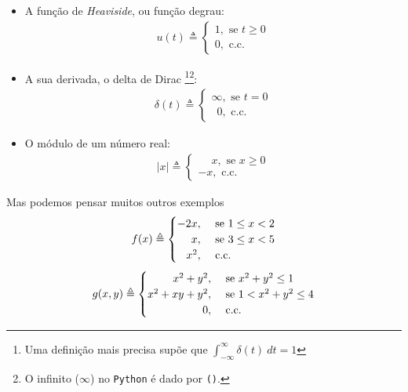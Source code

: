\begin{itemize}

	\item[] A função de \textit{Heaviside}, ou função degrau:
	\begin{align*}
		u(t) \triangleq	\begin{cases}
		1, \text{ se } t \geq 0\\
		0, \text{ c.c.}
		\end{cases}
	\end{align*}
	
	\item[] A sua derivada, o delta de Dirac \footnote{Uma definição mais precisa supõe que $\displaystyle \int_{-\infty}^{\infty} \delta(t)\ dt = 1$}\footnote{O infinito ($\infty$) no \texttt{Python} é dado por \texttt{()}.}:
	\begin{align*}
		\delta(t) \triangleq	\begin{cases}
		\infty, \text{ se } t = 0\\
		\phantom{0}0, \text{ c.c.}
		\end{cases}
	\end{align*}
	
	\item[] O módulo de um número real:
	\begin{align*}
		|x| \triangleq	\begin{cases}
		\phantom{-}x, \text{ se } x \geq 0\\
		-x, \text{ c.c.}
		\end{cases}
	\end{align*}	
\end{itemize}
	
	Mas podemos pensar muitos outros exemplos
	\begin{align*}
		f(x) \triangleq	\begin{cases}
		\hfill -2x,& \text{ se } 1 \leq x < 2\\ 
		\hfill x,& \text{ se } 3 \leq x < 5\\
		\hfill x^2,& \text{ c.c.}
		\end{cases}
	\end{align*}
	\begin{align*}
		g(x, y) \triangleq	\begin{cases}
		\hfill x^2 + y^2,& \text{ se } x^2 + y^2 \leq 1\\
		\hfill x^2 + xy + y^2,& \text{ se } 1 < x^2 + y^2 \leq 4\\
		\hfill 0,& \text{ c.c.}\\
		\end{cases}
	\end{align*}

